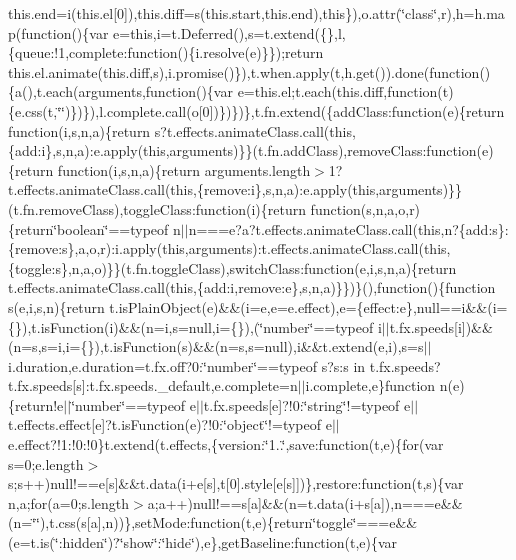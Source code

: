 {{this.\+end=i(this.\+el\mbox{[}0\mbox{]}),this.\+diff=s(this.\+start,this.\+end),this\}),o.\+attr(\char`\"{}class\char`\"{},r),h=h.\+map(function()\{var e=this,i=t.\+Deferred(),s=t.\+extend(\{\},l,\{queue\+:!1,complete\+:function()\{i.\+resolve(e)\}\});return this.\+el.\+animate(this.\+diff,s),i.\+promise()\}),t.\+when.\+apply(t,h.\+get()).\+done(function()\{a(),t.\+each(arguments,function()\{var e=this.\+el;t.\+each(this.\+diff,function(t)\{e.\+css(t,\char`\"{}\char`\"{})\})\}),l.\+complete.\+call(o\mbox{[}0\mbox{]})\})\})\},t.\+fn.\+extend(\{add\+Class\+:function(e)\{return function(i,s,n,a)\{return s?t.\+effects.\+animate\+Class.\+call(this,\{add\+:i\},s,n,a)\+:e.\+apply(this,arguments)\}\}(t.\+fn.\+add\+Class),remove\+Class\+:function(e)\{return function(i,s,n,a)\{return arguments.\+length$>$1?t.\+effects.\+animate\+Class.\+call(this,\{remove\+:i\},s,n,a)\+:e.\+apply(this,arguments)\}\}(t.\+fn.\+remove\+Class),toggle\+Class\+:function(i)\{return function(s,n,a,o,r)\{return\char`\"{}boolean\char`\"{}==typeof n$\vert$$\vert$n===e?a?t.\+effects.\+animate\+Class.\+call(this,n?\{add\+:s\}\+:\{remove\+:s\},a,o,r)\+:i.\+apply(this,arguments)\+:t.\+effects.\+animate\+Class.\+call(this,\{toggle\+:s\},n,a,o)\}\}(t.\+fn.\+toggle\+Class),switch\+Class\+:function(e,i,s,n,a)\{return t.\+effects.\+animate\+Class.\+call(this,\{add\+:i,remove\+:e\},s,n,a)\}\})\}(),function()\{function s(e,i,s,n)\{return t.\+is\+Plain\+Object(e)\&\&(i=e,e=e.\+effect),e=\{effect\+:e\},null==i\&\&(i=\{\}),t.\+is\+Function(i)\&\&(n=i,s=null,i=\{\}),(\char`\"{}number\char`\"{}==typeof i$\vert$$\vert$t.\+fx.\+speeds\mbox{[}i\mbox{]})\&\&(n=s,s=i,i=\{\}),t.\+is\+Function(s)\&\&(n=s,s=null),i\&\&t.\+extend(e,i),s=s$\vert$$\vert$i.\+duration,e.\+duration=t.\+fx.\+off?0\+:\char`\"{}number\char`\"{}==typeof s?s\+:s in t.\+fx.\+speeds?t.\+fx.\+speeds\mbox{[}s\mbox{]}\+:t.\+fx.\+speeds.\+\_\+default,e.\+complete=n$\vert$$\vert$i.\+complete,e\}function n(e)\{return!e$\vert$$\vert$\char`\"{}number\char`\"{}==typeof e$\vert$$\vert$t.\+fx.\+speeds\mbox{[}e\mbox{]}?!0\+:\char`\"{}string\char`\"{}!=typeof e$\vert$$\vert$t.\+effects.\+effect\mbox{[}e\mbox{]}?t.\+is\+Function(e)?!0\+:\char`\"{}object\char`\"{}!=typeof e$\vert$$\vert$e.\+effect?!1\+:!0\+:!0\}t.\+extend(t.\+effects,\{version\+:\char`\"{}1..\char`\"{},save\+:function(t,e)\{for(var s=0;e.\+length$>$s;s++)null!==e\mbox{[}s\mbox{]}\&\&t.\+data(i+e\mbox{[}s\mbox{]},t\mbox{[}0\mbox{]}.\+style\mbox{[}e\mbox{[}s\mbox{]}\mbox{]})\},restore\+:function(t,s)\{var n,a;for(a=0;s.\+length$>$a;a++)null!==s\mbox{[}a\mbox{]}\&\&(n=t.\+data(i+s\mbox{[}a\mbox{]}),n===e\&\&(n=\char`\"{}\char`\"{}),t.\+css(s\mbox{[}a\mbox{]},n))\},set\+Mode\+:function(t,e)\{return\char`\"{}toggle\char`\"{}===e\&\&(e=t.\+is(\char`\"{}\+:hidden\char`\"{})?\char`\"{}show\char`\"{}\+:\char`\"{}hide\char`\"{}),e\},get\+Baseline\+:function(t,e)\{var }}
